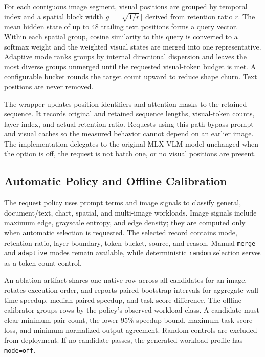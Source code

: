 \documentclass[11pt]{article}
\begin{document}
For each contiguous image segment, visual positions are grouped by temporal index and a spatial block width $g=\lceil\sqrt{1/r}\rceil$ derived from retention ratio $r$. The mean hidden state of up to 48 trailing text positions forms a query vector. Within each spatial group, cosine similarity to this query is converted to a softmax weight and the weighted visual states are merged into one representative. Adaptive mode ranks groups by internal directional dispersion and leaves the most diverse groups unmerged until the requested visual-token budget is met. A configurable bucket rounds the target count upward to reduce shape churn. Text positions are never removed.

The wrapper updates position identifiers and attention masks to the retained sequence. It records original and retained sequence lengths, visual-token counts, layer index, and actual retention ratio. Requests using this path bypass prompt and visual caches so the measured behavior cannot depend on an earlier image. The implementation delegates to the original MLX-VLM model unchanged when the option is off, the request is not batch one, or no visual positions are present.

\subsection{Automatic Policy and Offline Calibration}
The request policy uses prompt terms and image signals to classify general, document/text, chart, spatial, and multi-image workloads. Image signals include maximum edge, grayscale entropy, and edge density; they are computed only when automatic selection is requested. The selected record contains mode, retention ratio, layer boundary, token bucket, source, and reason. Manual \texttt{merge} and \texttt{adaptive} modes remain available, while deterministic \texttt{random} selection serves as a token-count control.

An ablation artifact shares one native row across all candidates for an image, rotates execution order, and reports paired bootstrap intervals for aggregate wall-time speedup, median paired speedup, and task-score difference. The offline calibrator groups rows by the policy's observed workload class. A candidate must clear minimum pair count, the lower 95\% speedup bound, maximum task-score loss, and minimum normalized output agreement. Random controls are excluded from deployment. If no candidate passes, the generated workload profile has \texttt{mode=off}.
\end{document}
